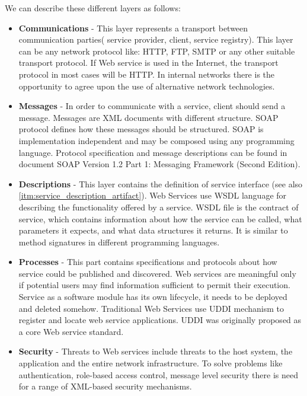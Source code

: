 We can describe these different layers as follows:
\begin{itemize}
  \item \textbf{Communications} - This layer represents a transport between
  communication parties( service provider, client, service registry). This layer
  can be any network protocol like: \gls{HTTP}, \gls{FTP}, \gls{SMTP} or any
  other suitable transport protocol. If Web service is used in the Internet, the
  transport protocol in most cases will be \gls{HTTP}. In internal networks there is the opportunity to agree upon the use of alternative
network technologies.

\item \textbf{Messages} - In order to communicate with a service, client should
send a message. Messages are \gls{XML} documents with different structure.
\gls{SOAP} protocol defines how these messages should be structured.
\gls{SOAP} is implementation independent and may be composed using any
programming language. Protocol specification and message descriptions can be
found in document SOAP Version 1.2 Part 1: Messaging Framework (Second
Edition)\cite{soap_protocol_spec}.

\item \textbf{Descriptions} - This layer contains the definition of service
interface (see also \autoref{itm:service_description_artifact}). Web Services
use \gls{WSDL} language for describing the functionality offered by a service.
\gls{WSDL} file is the contract of service, which contains information about how
the service can be called, what parameters it expects, and what data structures it returns.
It is similar to method signatures in different programming languages.

\item \textbf{Processes} - This part contains specifications and protocols
about how service could be published and discovered. Web services are meaningful
only if potential users may find information sufficient to permit their execution.
Service as a software module has its own lifecycle, it needs to be deployed and deleted somehow.
Traditional Web Services use \gls{UDDI}  mechanism to register and locate web
service applications. \gls{UDDI} was originally proposed as a core Web service
standard.

\item \textbf{Security} - Threats to Web services include threats to the host
system, the application and the entire network infrastructure. To solve problems
like authentication, role-based access control, message level security there is
need for a range of XML-based security mechanisms.


\end{itemize}
